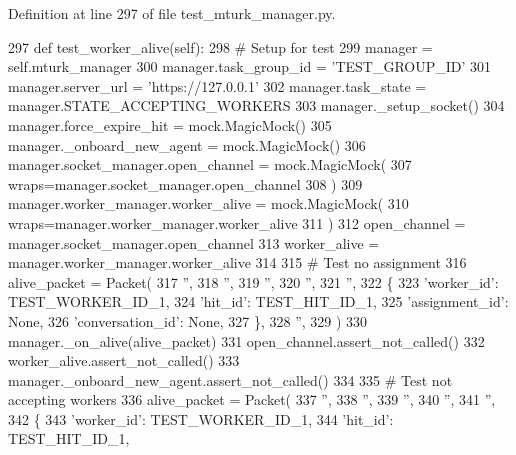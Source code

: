 Definition at line 297 of file test\+\_\+mturk\+\_\+manager.\+py.


\begin{DoxyCode}
297     \textcolor{keyword}{def }test\_worker\_alive(self):
298         \textcolor{comment}{# Setup for test}
299         manager = self.mturk\_manager
300         manager.task\_group\_id = \textcolor{stringliteral}{'TEST\_GROUP\_ID'}
301         manager.server\_url = \textcolor{stringliteral}{'https://127.0.0.1'}
302         manager.task\_state = manager.STATE\_ACCEPTING\_WORKERS
303         manager.\_setup\_socket()
304         manager.force\_expire\_hit = mock.MagicMock()
305         manager.\_onboard\_new\_agent = mock.MagicMock()
306         manager.socket\_manager.open\_channel = mock.MagicMock(
307             wraps=manager.socket\_manager.open\_channel
308         )
309         manager.worker\_manager.worker\_alive = mock.MagicMock(
310             wraps=manager.worker\_manager.worker\_alive
311         )
312         open\_channel = manager.socket\_manager.open\_channel
313         worker\_alive = manager.worker\_manager.worker\_alive
314 
315         \textcolor{comment}{# Test no assignment}
316         alive\_packet = Packet(
317             \textcolor{stringliteral}{''},
318             \textcolor{stringliteral}{''},
319             \textcolor{stringliteral}{''},
320             \textcolor{stringliteral}{''},
321             \textcolor{stringliteral}{''},
322             \{
323                 \textcolor{stringliteral}{'worker\_id'}: TEST\_WORKER\_ID\_1,
324                 \textcolor{stringliteral}{'hit\_id'}: TEST\_HIT\_ID\_1,
325                 \textcolor{stringliteral}{'assignment\_id'}: \textcolor{keywordtype}{None},
326                 \textcolor{stringliteral}{'conversation\_id'}: \textcolor{keywordtype}{None},
327             \},
328             \textcolor{stringliteral}{''},
329         )
330         manager.\_on\_alive(alive\_packet)
331         open\_channel.assert\_not\_called()
332         worker\_alive.assert\_not\_called()
333         manager.\_onboard\_new\_agent.assert\_not\_called()
334 
335         \textcolor{comment}{# Test not accepting workers}
336         alive\_packet = Packet(
337             \textcolor{stringliteral}{''},
338             \textcolor{stringliteral}{''},
339             \textcolor{stringliteral}{''},
340             \textcolor{stringliteral}{''},
341             \textcolor{stringliteral}{''},
342             \{
343                 \textcolor{stringliteral}{'worker\_id'}: TEST\_WORKER\_ID\_1,
344                 \textcolor{stringliteral}{'hit\_id'}: TEST\_HIT\_ID\_1,

\end{DoxyCode}
